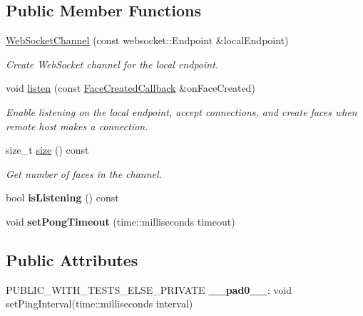 \subsection*{Public Member Functions}
\begin{DoxyCompactItemize}
\item 
\hyperlink{classnfd_1_1WebSocketChannel_ae9c170acd8487279032e2a34aa35b0e2}{Web\+Socket\+Channel} (const websocket\+::\+Endpoint \&local\+Endpoint)
\begin{DoxyCompactList}\small\item\em Create Web\+Socket channel for the local endpoint. \end{DoxyCompactList}\item 
void \hyperlink{classnfd_1_1WebSocketChannel_a7497f5bf01ac4f26a5edef07a48ccccc}{listen} (const \hyperlink{classnfd_1_1Channel_a47f1a8874228ad9dfa38b4e96f6f8d57}{Face\+Created\+Callback} \&on\+Face\+Created)
\begin{DoxyCompactList}\small\item\em Enable listening on the local endpoint, accept connections, and create faces when remote host makes a connection. \end{DoxyCompactList}\item 
size\+\_\+t \hyperlink{classnfd_1_1WebSocketChannel_a05be8778029ee579f977b5269f569ea7}{size} () const\hypertarget{classnfd_1_1WebSocketChannel_a05be8778029ee579f977b5269f569ea7}{}\label{classnfd_1_1WebSocketChannel_a05be8778029ee579f977b5269f569ea7}

\begin{DoxyCompactList}\small\item\em Get number of faces in the channel. \end{DoxyCompactList}\item 
bool {\bfseries is\+Listening} () const\hypertarget{classnfd_1_1WebSocketChannel_ab8890e00dcdf3c3a41363d69e0ce3414}{}\label{classnfd_1_1WebSocketChannel_ab8890e00dcdf3c3a41363d69e0ce3414}

\item 
void {\bfseries set\+Pong\+Timeout} (time\+::milliseconds timeout)\hypertarget{classnfd_1_1WebSocketChannel_ad895f4e35bdada43636636f454c5953c}{}\label{classnfd_1_1WebSocketChannel_ad895f4e35bdada43636636f454c5953c}

\end{DoxyCompactItemize}
\subsection*{Public Attributes}
\begin{DoxyCompactItemize}
\item 
P\+U\+B\+L\+I\+C\+\_\+\+W\+I\+T\+H\+\_\+\+T\+E\+S\+T\+S\+\_\+\+E\+L\+S\+E\+\_\+\+P\+R\+I\+V\+A\+TE {\bfseries \+\_\+\+\_\+pad0\+\_\+\+\_\+}\+: void set\+Ping\+Interval(time\+::milliseconds interval)\hypertarget{classnfd_1_1WebSocketChannel_a6a4bd56070388f2a258e2b101432495a}{}\label{classnfd_1_1WebSocketChannel_a6a4bd56070388f2a258e2b101432495a}

\end{DoxyCompactItemize}
